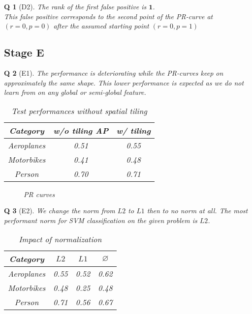 \documentclass[11pt]{article}
\theoremstyle{exo}
\newtheorem*{exercise}{Q}
\newcommand{\1}{\mathbf{1}}
\newcommand{\0}{\mathbf{0}}
\begin{document}
\begin{exercise}[D2]
	The rank of the first false positive is $\mathbf 1$.\\
	This false positive corresponds to the second point of the PR-curve at $(r=0,p=0)$ after the assumed starting point $(r=0,p=1)$
\end{exercise}

\subsection*{Stage E}
\begin{exercise}[E1]
	The performance is deteriorating while the PR-curves keep on approximately the same shape. This lower performance is expected as we do not learn from on any global or semi-global feature.
	\begin{table}[H]
	\centering
	\caption{Test performances without spatial tiling}
	\begin{tabular}{||c|c|c||}
	\hline
	Category & w/o tiling AP & w/ tiling\\
	\hline
	Aeroplanes &0.51 & 0.55\\
	Motorbikes & 0.41 & 0.48\\
	Person  &0.70 & 0.71\\
	\hline
	\end{tabular}
	\end{table}
	\begin{figure}[H]
	\centering
	\caption{PR curves}
	\end{figure}
\end{exercise}


\begin{exercise}[E2]
	We change the norm from $L2$ to $L1$ then to no norm at all. The most performant norm for SVM classification on the given problem is $L2$.
	\begin{table}[H]
	\centering
	\caption{Impact of normalization}
	\begin{tabular}{||c|c|c|c||}
	\hline
	Category &$L2$ & $L1$ & $\varnothing$\\
	\hline
	Aeroplanes & 0.55 & 0.52 & 0.62\\
	Motorbikes & 0.48 & 0.25 &  0.48 \\
	Person & 0.71 & 0.56 & 0.67 \\
	\hline
	\end{tabular}
	\end{table}
\end{exercise}
\end{document}
